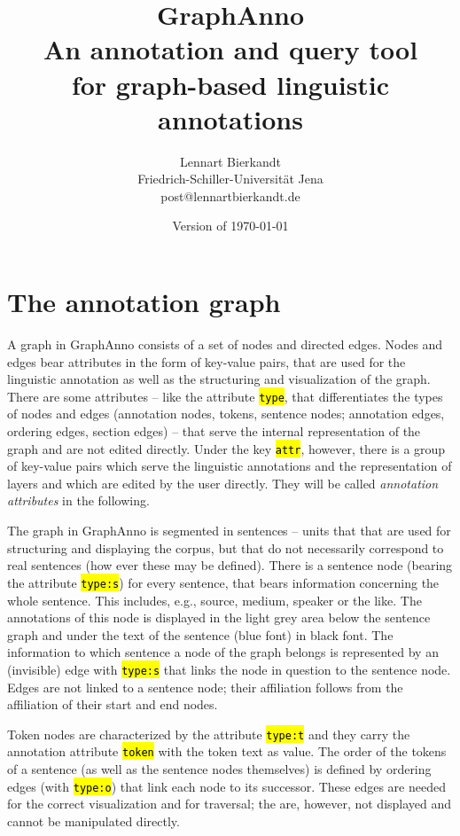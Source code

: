 \documentclass[12pt]{scrartcl}
\title{\LARGE GraphAnno\\ \large An annotation and query tool\\for graph-based linguistic annotations}
\author{Lennart Bierkandt\\\large Friedrich-Schiller-Universität Jena\\[-.2em]\large post@lennartbierkandt.de}
\date{Version of \today}
\newcommand{\code}[1]{\hl{\texttt{#1}}}
\begin{document}
\maketitle

\renewcommand{\baselinestretch}{1.05}\normalsize

\tableofcontents


\section{The annotation graph}

A graph in GraphAnno consists of a set of nodes and directed edges.
Nodes and edges bear attributes in the form of key-value pairs, that are used for the linguistic annotation as well as the structuring and visualization of the graph.
There are some attributes – like the attribute \code{type}, that differentiates the types of nodes and edges (annotation nodes, tokens, sentence nodes; annotation edges, ordering edges, section edges) – that serve the internal representation of the graph and are not edited directly.
Under the key \code{attr}, however, there is a group of key-value pairs which serve the linguistic annotations and the representation of layers and which are edited by the user directly.
They will be called \textit{annotation attributes} in the following.

The graph in GraphAnno is segmented in sentences – units that that are used for structuring and displaying the corpus, but that do not necessarily correspond to real sentences (how ever these may be defined).
There is a sentence node (bearing the attribute \code{type:s}) for every sentence, that bears information concerning the whole sentence.
This includes, e.g., source, medium, speaker or the like.
The annotations of this node is displayed in the light grey area below the sentence graph and under the text of the sentence (blue font) in black font.
The information to which sentence a node of the graph belongs is represented by an (invisible) edge with \code{type:s} that links the node in question to the sentence node.
Edges are not linked to a sentence node; their affiliation follows from the affiliation of their start and end nodes.

Token nodes are characterized by the attribute \code{type:t} and they carry the annotation attribute \code{token} with the token text as value.
The order of the tokens of a sentence (as well as the sentence nodes themselves) is defined by ordering edges (with \code{type:o}) that link each node to its successor.
These edges are needed for the correct visualization and for traversal; the are, however, not displayed and cannot be manipulated directly.
\end{document}
